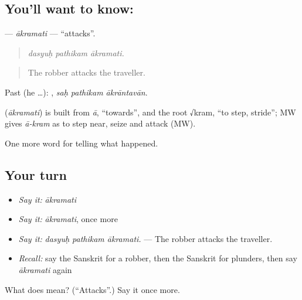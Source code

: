 \subsection*{You'll want to know: }
\textbf{} — \emph{ākramati} — \textquotedblleft{}attacks\textquotedblright{}.

\begin{quote}
  
\end{quote}

\begin{quote}
\emph{dasyuḥ pathikam ākramati.}
\end{quote}

\begin{quote}
The robber attacks the traveller.
\end{quote}

Past (he …):   , \emph{saḥ pathikam ākrāntavān}.

\begin{cousinweb}
\textbf{} (\emph{ākramati}) is built from \emph{ā}, \textquotedblleft{}towards\textquotedblright{}, and the root √kram, \textquotedblleft{}to step, stride\textquotedblright{}; MW gives \emph{ā-kram} as to step near, seize and attack (MW).
\end{cousinweb}

\begin{grammarlens}[title={What you've built}]
One more word for telling what happened.
\end{grammarlens}

\subsection*{Your turn}
\begin{itemize}
\raggedright
  \item \emph{Say it:} \emph{ākramati}
  \item \emph{Say it:} \emph{ākramati}, once more
  \item \emph{Say it:} \emph{dasyuḥ pathikam ākramati.} — The robber attacks the traveller.
  \item \emph{Recall:} say the Sanskrit for a robber, then the Sanskrit for plunders, then say \emph{ākramati} again
\end{itemize}

\begin{tcolorbox}[breakable,colback=teal!4,colframe=teal!35!black,title={Before you move on}]
What does  mean? (\textquotedblleft{}Attacks\textquotedblright{}.) Say it once more.
\end{tcolorbox}
